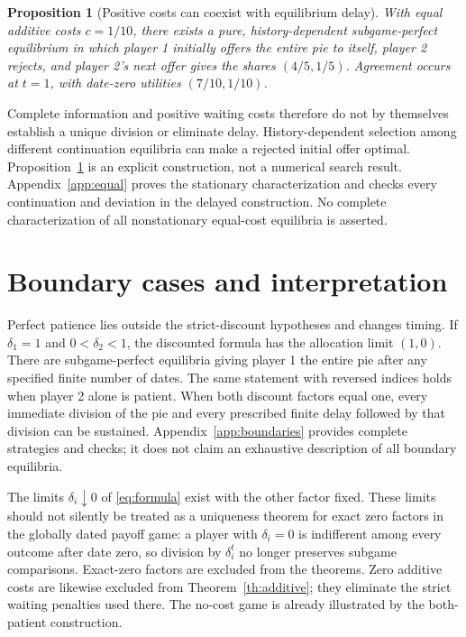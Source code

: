 \documentclass[11pt]{article}
\newtheorem{proposition}[theorem]{Proposition}
\begin{document}
\begin{proposition}[Positive costs can coexist with equilibrium delay]\label{prop:delay}
With equal additive costs $c=1/10$, there exists a pure, history-dependent subgame-perfect equilibrium in which player 1 initially offers the entire pie to itself, player 2 rejects, and player 2's next offer gives the shares $(4/5,1/5)$. Agreement occurs at $t=1$, with date-zero utilities $(7/10,1/10)$.
\end{proposition}

Complete information and positive waiting costs therefore do not by themselves establish a unique division or eliminate delay. History-dependent selection among different continuation equilibria can make a rejected initial offer optimal. Proposition~\ref{prop:delay} is an explicit construction, not a numerical search result. Appendix~\ref{app:equal} proves the stationary characterization and checks every continuation and deviation in the delayed construction. No complete characterization of all nonstationary equal-cost equilibria is asserted.

\section{Boundary cases and interpretation}\label{sec:boundaries}
Perfect patience lies outside the strict-discount hypotheses and changes timing. If $\delta_1=1$ and $0<\delta_2<1$, the discounted formula has the allocation limit $(1,0)$. There are subgame-perfect equilibria giving player 1 the entire pie after any specified finite number of dates. The same statement with reversed indices holds when player 2 alone is patient. When both discount factors equal one, every immediate division of the pie and every prescribed finite delay followed by that division can be sustained. Appendix~\ref{app:boundaries} provides complete strategies and checks; it does not claim an exhaustive description of all boundary equilibria.

The limits $\delta_i\downarrow0$ of \eqref{eq:formula} exist with the other factor fixed. These limits should not silently be treated as a uniqueness theorem for exact zero factors in the globally dated payoff game: a player with $\delta_i=0$ is indifferent among every outcome after date zero, so division by $\delta_i^t$ no longer preserves subgame comparisons. Exact-zero factors are excluded from the theorems. Zero additive costs are likewise excluded from Theorem~\ref{th:additive}; they eliminate the strict waiting penalties used there. The no-cost game is already illustrated by the both-patient construction.
\end{document}
